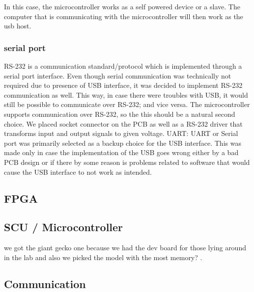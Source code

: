 In this case, the microcontroller works as a self powered device or a slave. The computer that is communicating with the microcontroller
will then work as the usb host.


\subsubsection{serial port} 

RS-232 is a communication standard/protocol which is implemented through a serial port interface.
Even though serial communication was technically not required due to presence of USB interface, it was decided to implement RS-232 communication as well.
This way, in case there were troubles with USB, it would still be possible to communicate over RS-232; and vice versa.
The microcontroller supports communication over RS-232, so the this should be a natural second choice.
We placed socket connector on the PCB as well as a RS-232 driver that transforms input and output signals to given voltage.
UART: UART or Serial port was primarily selected as a backup choice for the USB interface. This was made only in case the implementation
of the USB goes wrong either by a bad PCB design or if there by some reason is problems related to software that would cause the USB interface to not work as intended.


\subsection{FPGA}


\subsection{SCU / Microcontroller}
we got the giant gecko one because we had the dev board for those lying around in the lab and also we picked the model with the most memory? .


\subsection{Communication} \label{pcb:design-choices:ss:internal_communication}

